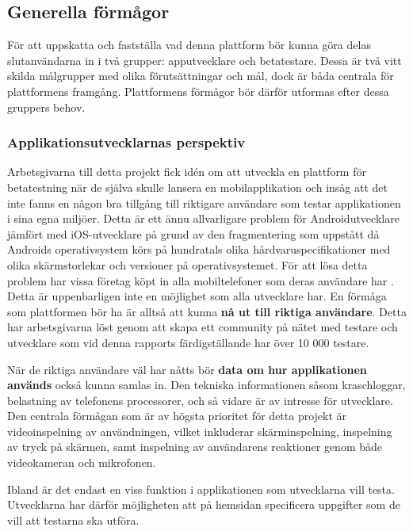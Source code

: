 \subsection{Generella förmågor}
\label{subsec:generalcapabilities}
För att uppskatta och fastställa vad denna plattform bör kunna göra delas slutanvändarna in i två grupper: apputvecklare och betatestare. Dessa är två vitt skilda målgrupper med olika förutsättningar och mål, dock är båda centrala för plattformens framgång. Plattformens förmågor bör därför utformas efter dessa gruppers behov. 

\subsubsection{Applikationsutvecklarnas perspektiv}
Arbetsgivarna till detta projekt fick idén om att utveckla en plattform för betatestning när de själva skulle lansera en mobilapplikation och insåg att det inte fanns en någon bra tillgång till riktigare användare som testar applikationen i sina egna miljöer. Detta är ett ännu allvarligare problem för Androidutvecklare jämfört med iOS-utvecklare på grund av den fragmentering som uppstått då Androids operativsystem körs på hundratals olika hårdvaruspecifikationer med olika skärmstorlekar och versioner på operativsystemet. För att lösa detta problem har vissa företag köpt in alla mobiltelefoner som deras användare har \parencite{buyAllPhones}. Detta är uppenbarligen inte en möjlighet som alla utvecklare har. En förmåga som plattformen bör ha är alltså att kunna {\bfseries nå ut till riktiga användare}. Detta har arbetsgivarna löst genom att skapa ett community på nätet med testare och utvecklare som vid denna rapports färdigställande har över 10 000 testare\parencite{betafamily}.

När de riktiga användare väl har nåtts bör {\bfseries data om hur applikationen används} också kunna samlas in. Den tekniska informationen såsom kraschloggar, belastning av telefonens processorer, och så vidare är av intresse för utvecklare. Den centrala förmågan som är av högsta prioritet för detta projekt är videoinspelning av användningen, vilket inkluderar skärminspelning, inspelning av tryck på skärmen, samt inspelning av användarens reaktioner genom både videokameran och mikrofonen. 

Ibland är det endast en viss funktion i applikationen som utvecklarna vill testa. Utvecklarna har därför möjligheten att på hemsidan specificera uppgifter som de vill att testarna ska utföra. 

